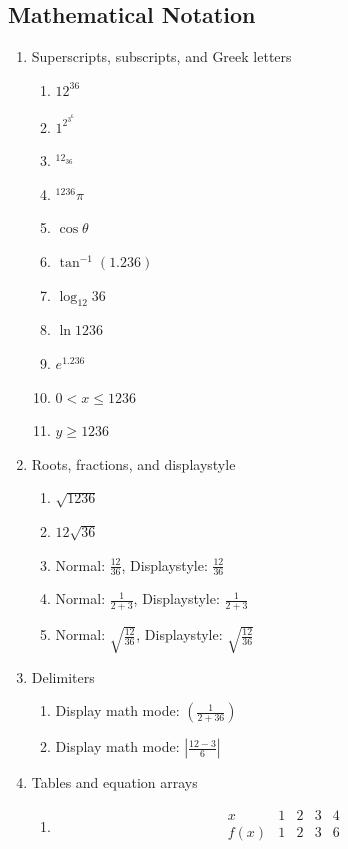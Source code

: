 \documentclass[12pt]{article}
\begin{document}
\subsection{Mathematical Notation}
\begin{enumerate}
    \item Superscripts, subscripts, and Greek letters
    \begin{enumerate}
        \item $12^{36}$
        \item $1^{2^{3^6}}$
        \item $^{12_{36}}$
        \item $^{1236}{\pi}$
        \item $\cos \theta$
        \item $\tan^{-1}(1.236)$
        \item $\log_{12} 36$
        \item $\ln 1236$
        \item $e^{1.236}$
        \item $0 < x \leq 1236$
        \item $y \geq 1236$
    \end{enumerate}
    \item Roots, fractions, and displaystyle
    \begin{enumerate}
        \item $\sqrt{1236}$
        \item $12\sqrt{36}$
        \item Normal: $\frac{12}{36}$, Displaystyle: $\displaystyle\frac{12}{36}$
        \item Normal: $\frac{1}{2+3}$, Displaystyle: $\displaystyle\frac{1}{2+3}$
        \item Normal: $\sqrt{\frac{12}{36}}$, Displaystyle: $\displaystyle\sqrt{\frac{12}{36}}$
    \end{enumerate}

    \item Delimiters
    \begin{enumerate}
        \item Display math mode: $\left(\frac{1}{2+36}\right)$
        \item Display math mode: $\left|\frac{12-3}{6}\right|$
    \end{enumerate}

    \item Tables and equation arrays
    \begin{enumerate}
        \item 
        \[
        \begin{array}{c|c|c|c|c}
        x & 1 & 2 & 3 & 4 \\
        \hline
        f(x) & 1 & 2 & 3 & 6 \\
        \end{array}
        \]


\end{enumerate}
\end{enumerate}
\end{document}
